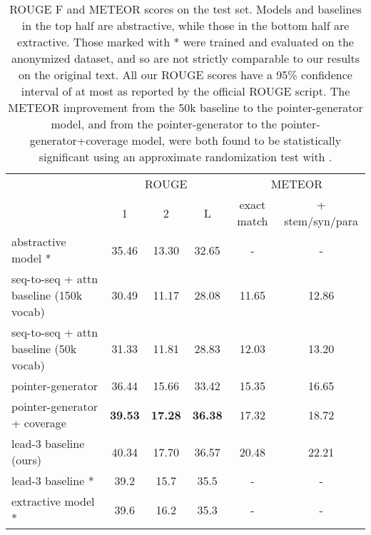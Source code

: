 \documentclass[11pt,a4paper]{article}
\begin{document}
\begin{table*}[t]
\centering
\begin{tabular}{ | l | c | c | c | c | c |}
\hline
 & \multicolumn{3}{|c|}{ROUGE} & \multicolumn{2}{|c|}{METEOR} \\ \cline{2-6}
& 1 & 2 & L & exact match & + stem/syn/para \\ \hline
abstractive model \cite{nallapati2016abstractive}* & 35.46 & 13.30 & 32.65 & - & - \\
seq-to-seq + attn baseline (150k vocab) & 30.49 & 11.17 & 28.08 & 11.65 & 12.86 \\
seq-to-seq + attn baseline (50k vocab) & 31.33 & 11.81 & 28.83 & 12.03 & 13.20  \\
pointer-generator & 36.44 & 15.66 & 33.42 & 15.35 & 16.65  \\
pointer-generator + coverage & \textbf{39.53} & \textbf{17.28} & \textbf{36.38} & 17.32 & 18.72 \\ \hline
lead-3 baseline (ours) & 40.34 & 17.70 & 36.57 & 20.48 & 22.21 \\
lead-3 baseline \cite{nallapati2016summarunner}* & 39.2 & 15.7 & 35.5 &  -  & - \\
extractive model \cite{nallapati2016summarunner}* & 39.6 & 16.2  & 35.3 & - & - \\ \hline
\end{tabular}
\caption{ROUGE F and METEOR scores on the test set.
Models and baselines in the top half are abstractive, while those in the bottom half are extractive.
Those marked with * were trained and evaluated on the anonymized dataset, and so are not strictly comparable to our results on the original text.
All our ROUGE scores have a 95\% confidence interval of at most  as reported by the official ROUGE script.
The METEOR improvement from the 50k baseline to the pointer-generator model, and from the pointer-generator to the pointer-generator+coverage model, were both found to be statistically significant using an approximate randomization test with .
}
\label{tab_results}
\end{table*}
 
\end{document}
